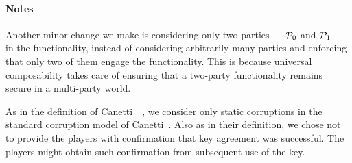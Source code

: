 \paragraph{Notes}
Another minor change we make is considering only two parties --- $\mathcal{P}_{0}$ and $\mathcal{P}_{1}$ --- in the functionality, instead of considering arbitrarily many parties and enforcing that only two of them engage the functionality. 
This is because universal composability takes care of ensuring that a two-party functionality remains secure in a multi-party world.

As in the definition of Canetti~\etal~\cite{EC:CHKLM05}, we consider only static corruptions in the standard corruption model of Canetti~\cite{FOCS:Canetti01}.
Also as in their definition, we chose not to provide the players with confirmation that key agreement was successful.
The players might obtain such confirmation from subsequent use of the key.


